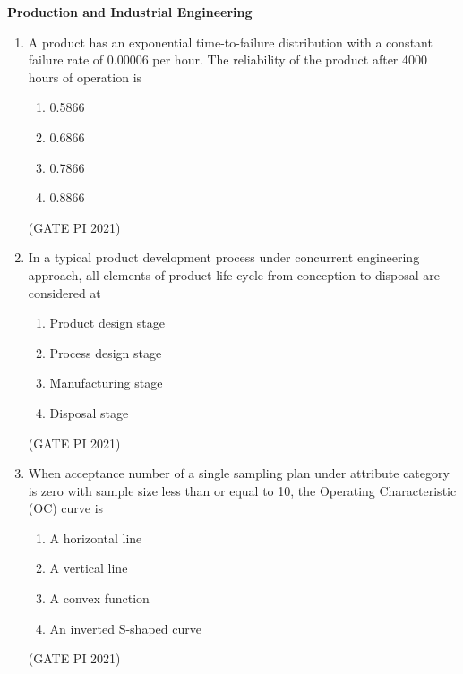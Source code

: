 \documentclass[journal,12pt,onecolumn]{IEEEtran}
\theoremstyle{remark}
\begin{document}
\newpage
\textbf{Production and Industrial Engineering}
\begin{enumerate}
    
\item
A product has an exponential time-to-failure distribution with a constant failure rate of 0.00006 per hour. The reliability of the product after 4000 hours of operation is

\begin{multicols}{4}
\begin{enumerate}
\item 0.5866
\item 0.6866
\item 0.7866
\item 0.8866
\end{enumerate}
\end{multicols}

\hfill (GATE PI 2021)

\item
In a typical product development process under concurrent engineering approach, all elements of product life cycle from conception to disposal are considered at

\begin{multicols}{2}
\begin{enumerate}
\item Product design stage
\item Process design stage
\item Manufacturing stage
\item Disposal stage
\end{enumerate}
\end{multicols}

\hfill (GATE PI 2021)

\item
When acceptance number of a single sampling plan under attribute category is zero with sample size less than or equal to 10, the Operating Characteristic (OC) curve is

\begin{multicols}{2}
\begin{enumerate}
\item A horizontal line
\item A vertical line
\item A convex function
\item An inverted S-shaped curve
\end{enumerate}
\end{multicols}

\hfill (GATE PI 2021)


\end{enumerate}
\end{document}
